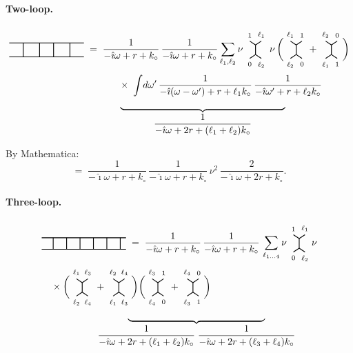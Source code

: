\documentclass[11pt,a4paper]{article}
\newcommand{\Hvert}[4]{%
\begin{tikzpicture}[baseline=-0.5ex,scale=0.7]
  \draw[thick] (-0.3,0.45) node[above]{\scriptsize $#1$} -- (0,0.25);
  \draw[thick] (0.3,0.45) node[above]{\scriptsize $#2$} -- (0,0.25);
  \draw[thick] (0,0.25)--(0,-0.25);
  \draw[thick] (-0.3,-0.45) node[below]{\scriptsize $#3$} -- (0,-0.25);
  \draw[thick] (0.3,-0.45) node[below]{\scriptsize $#4$} -- (0,-0.25);
\end{tikzpicture}}
\begin{document}
\paragraph{Two-loop.}
\begin{align*}
\!\!\!\!\!\!\!\!
&\begin{tikzpicture}[baseline=-2pt,scale=0.85,every node/.style={font=\scriptsize}]
  \draw[thick] (-1.6,0.3)--(1.6,0.3);
  \draw[thick] (-1.6,-0.3)--(1.6,-0.3);
  \draw[thick] (-1.0,0.3)--(-1.0,-0.3);
  \draw[thick] (-0.3,0.3)--(-0.3,-0.3);
  \draw[thick] ( 0.3,0.3)--( 0.3,-0.3);
  \draw[thick] ( 1.0,0.3)--( 1.0,-0.3);
\end{tikzpicture}
\;=\; \frac{1}{-\hat{\imath}\omega+r+k_\circ}\,\frac{1}{-\hat{\imath}\omega+r+k_\circ}
\sum_{\ell_1,\ell_2}\nu\,\Hvert{1}{\ell_1}{0}{\ell_2}\,\nu\,\bigg(\Hvert{\ell_1}{1}{\ell_2}{0}+\Hvert{\ell_2}{0}{\ell_1}{1}\bigg)\\
&\hspace{4cm}\times\;\int\!d\omega'\,\frac{1}{-\hat{\imath}(\omega-\omega')+r+\ell_1 k_\circ}\,\frac{1}{-\hat{\imath}\omega'+r+\ell_2 k_\circ}\\
&\hspace{4cm}\underbrace{\hspace{6cm}}_{\displaystyle \frac{1}{-\hat{\imath}\omega+2r+(\ell_1+\ell_2)k_\circ}}
\end{align*}

By Mathematica:
\[
=\;\frac{1}{-\hat{\imath}\omega + r + k_\circ}\,\frac{1}{-\hat{\imath}\omega + r + k_\circ}\,\nu^2\,\frac{2}{-\hat{\imath}\omega+2r+k_\circ}.
\]

\paragraph{Three-loop.}
\begin{align*}
&\begin{tikzpicture}[baseline=-2pt,scale=0.7,every node/.style={font=\tiny}]
  \draw[thick] (-2.2,0.3)--(2.2,0.3);
  \draw[thick] (-2.2,-0.3)--(2.2,-0.3);
  \foreach \x in {-1.6,-0.9,-0.2,0.5,1.2,1.9} {\draw[thick] (\x,0.3)--(\x,-0.3);}
\end{tikzpicture}
\;=\;\frac{1}{-\hat{\imath}\omega+r+k_\circ}\,\frac{1}{-\hat{\imath}\omega+r+k_\circ}\,\sum_{\ell_{1\ldots 4}}\nu\,\Hvert{1}{\ell_1}{0}{\ell_2}\nu\\[-2pt]
&\quad\times\bigg(\Hvert{\ell_1}{\ell_3}{\ell_2}{\ell_4}+\Hvert{\ell_2}{\ell_4}{\ell_1}{\ell_3}\bigg)\bigg(\Hvert{\ell_3}{1}{\ell_4}{0}+\Hvert{\ell_4}{0}{\ell_3}{1}\bigg)\\
&\hspace{2cm}\underbrace{\hspace{5cm}}_{\displaystyle \frac{1}{-\hat{\imath}\omega+2r+(\ell_1+\ell_2)k_\circ}\;\frac{1}{-\hat{\imath}\omega+2r+(\ell_3+\ell_4)k_\circ}}
\end{align*}
\end{document}
